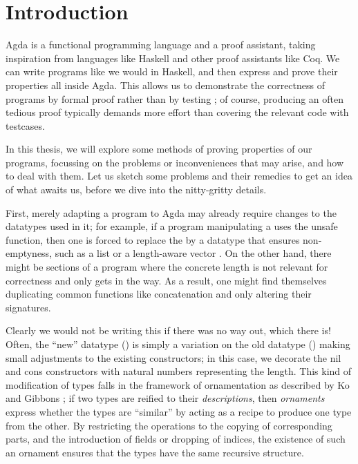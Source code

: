 \section{Introduction}\label{sec:intro}
Agda \cite{agda} is a functional programming language and a proof assistant, taking inspiration from languages like Haskell and other proof assistants like Coq. We can write programs like we would in Haskell, and then express and prove their properties all inside Agda. This allows us to demonstrate the correctness of programs by formal proof%
rather than by testing%
; of course, producing an often tedious proof typically demands more effort than covering the relevant code with testcases.

In this thesis, we will explore some methods of proving properties of our programs, focussing on the problems or inconveniences that may arise, and how to deal with them. Let us sketch some problems and their remedies to get an idea of what awaits us, before we dive into the nitty-gritty details.

First, merely adapting a program to Agda may already require changes to the datatypes used in it; for example, if a program manipulating a  uses the unsafe  function, then one is forced to replace the  by a datatype that ensures non-emptyness, such as a  list or a length-aware vector . On the other hand, there might be sections of a program where the concrete length is not relevant for correctness and only gets in the way. As a result, one might find themselves duplicating common functions like concatenation \AgdaFunction{\_++\_} and only altering their signatures.

Clearly we would not be writing this if there was no way out, which there is! Often, the ``new'' datatype () is simply a variation on the old datatype () making small adjustments to the existing constructors; in this case, we decorate the nil and cons constructors with natural numbers representing the length. This kind of modification of types falls in the framework of ornamentation as described by Ko and Gibbons \cite{progorn}; if two types are reified to their \textit{descriptions}, then \textit{ornaments} express whether the types are ``similar'' by acting as a recipe to produce one type from the other. By restricting the operations to the copying of corresponding parts, and the introduction of fields or dropping of indices, the existence of such an ornament ensures that the types have the same recursive structure.

